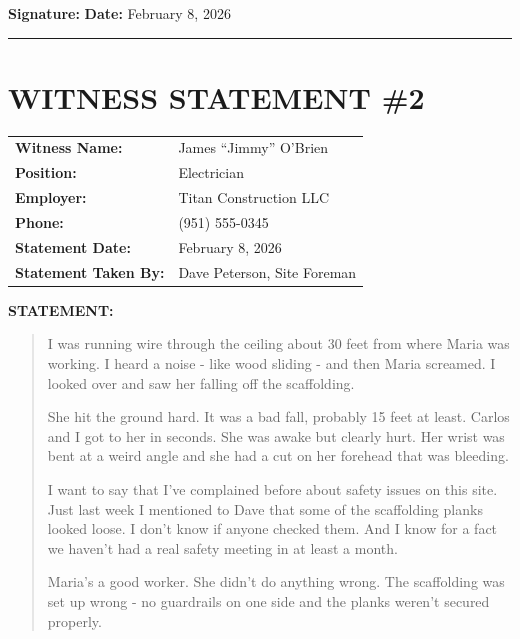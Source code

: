 \documentclass[11pt]{article}
\begin{document}
\vspace{1em}

\noindent\textbf{Signature:} \underline{\hspace{5cm}} \hfill \textbf{Date:} February 8, 2026

\vspace{3em}
\hrule
\vspace{2em}

\section*{WITNESS STATEMENT \#2}

\begin{tabular}{@{}p{4cm}p{10cm}@{}}
\textbf{Witness Name:} & James ``Jimmy'' O'Brien \\
\textbf{Position:} & Electrician \\
\textbf{Employer:} & Titan Construction LLC \\
\textbf{Phone:} & (951) 555-0345 \\
\textbf{Statement Date:} & February 8, 2026 \\
\textbf{Statement Taken By:} & Dave Peterson, Site Foreman \\
\end{tabular}

\vspace{1em}

\noindent\textbf{STATEMENT:}

\begin{quote}
I was running wire through the ceiling about 30 feet from where Maria was working. I heard a noise - like wood sliding - and then Maria screamed. I looked over and saw her falling off the scaffolding.

She hit the ground hard. It was a bad fall, probably 15 feet at least. Carlos and I got to her in seconds. She was awake but clearly hurt. Her wrist was bent at a weird angle and she had a cut on her forehead that was bleeding.

I want to say that I've complained before about safety issues on this site. Just last week I mentioned to Dave that some of the scaffolding planks looked loose. I don't know if anyone checked them. And I know for a fact we haven't had a real safety meeting in at least a month.

Maria's a good worker. She didn't do anything wrong. The scaffolding was set up wrong - no guardrails on one side and the planks weren't secured properly.
\end{quote}
\end{document}
